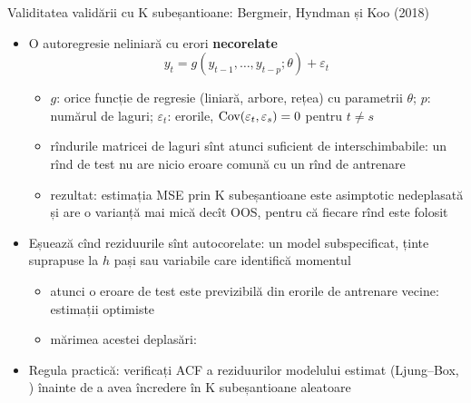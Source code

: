 \begin{frame}{Validitatea validării cu K subeșantioane: Bergmeir, Hyndman și Koo (2018)}
\itemsize{\small}
\begin{itemize}
    \item O autoregresie neliniară cu erori \textbf{necorelate} 
    \[ y_t = g(y_{t-1},\dots,y_{t-p}; \theta) + \varepsilon_t \]
    \begin{itemize}
        \item $g$: orice funcție de regresie (liniară, arbore, rețea) cu parametrii $\theta$; $p$: numărul de laguri; $\varepsilon_t$: erorile, $\text{Cov}(\varepsilon_t, \varepsilon_s) = 0$ pentru $t \ne s$
        \item rîndurile matricei de laguri sînt atunci suficient de interschimbabile: un rînd de test nu are nicio eroare comună cu un rînd de antrenare
        \item rezultat: estimația MSE prin K subeșantioane este asimptotic nedeplasată și are o varianță mai mică decît OOS, pentru că fiecare rînd este folosit
    \end{itemize}
    \item Eșuează cînd reziduurile sînt autocorelate: un model subspecificat, ținte suprapuse la $h$ pași sau variabile care identifică momentul
    \begin{itemize}
        \item atunci o eroare de test este previzibilă din erorile de antrenare vecine: estimații optimiste
        \item mărimea acestei deplasări:   %
    \end{itemize}
    \item Regula practică: verificați ACF a reziduurilor modelului estimat (Ljung--Box, ) înainte de a avea încredere în K subeșantioane aleatoare
\end{itemize}
\end{frame}

